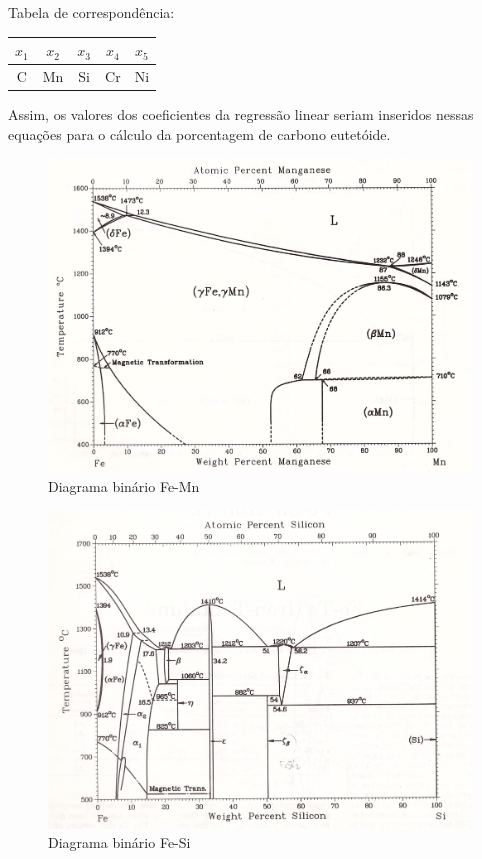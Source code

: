 \documentclass[brazil,tf,epusp]{usp}  %
\begin{document}
Tabela de correspondência:

\begin{table}[ht]
	\centering
	\begin{tabular}{c c c c c}
	\hline
	$x_1$ & $x_2$ & $x_3$ & $x_4$ & $x_5$ \\
	\hline
	C & Mn & Si & Cr & Ni \\
	\hline
	\end{tabular}
\end{table}

Assim, os valores dos coeficientes da regressão linear seriam inseridos nessas equações para o cálculo da porcentagem de carbono eutetóide.



\label{an:diag_bin}

\begin{figure}
  \includegraphics[width=1.1\textwidth]{img/Fe-Mn.jpg}
  \caption{Diagrama binário Fe-Mn \cite{Massalski1996v1}}
  \label{fig:bin_fe-mn}
\end{figure}

\begin{figure}
  \includegraphics[width=1.1\textwidth]{img/Fe-Si.jpg}
  \caption{Diagrama binário Fe-Si \cite{Massalski1996v1}}
  \label{fig:bin_fe-si}
\end{figure}
\end{document}
